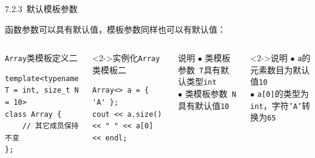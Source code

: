 \begin{frame}[fragile]{7.2.3~默认模板参数}

\alert{函数参数}可以具有默认值，\alert{模板参数}同样也可以有默认值：

\vspace{-4mm}

\begin{columns}[t]

\begin{blueblock}{\texttt{Array}类模板定义二}
\vspace{-1mm}\begin{lstlisting}[moreemph={Array,T,Less,F}]
template<typename T = int, size_t N = 10>
class Array {
    // 其它成员保持不变
};
\end{lstlisting}\vspace{-1mm}
\end{blueblock}
\begin{blueblock}<2->{实例化\texttt{Array}类模板二}
\begin{lstlisting}[moreemph={Array}]
Array<> a = { 'A' };
cout << a.size() << " " << a[0] << endl;
\end{lstlisting}
\end{blueblock}

\begin{yellowblock}{说明}
$\bullet$ \alert{类模板参数}~\texttt{T}具有默认类型\texttt{int}\\
$\bullet$ \alert{类模板参数}~\texttt{N}具有默认值\texttt{10}
\end{yellowblock}
\begin{yellowblock}<2->{说明}
$\bullet$ \texttt{a}的元素数目为默认值\texttt{10}\\
$\bullet$ \texttt{a[0]}的类型为\texttt{int}，字符\texttt{'A'}转换为\texttt{65}
\end{yellowblock}

\end{columns}

\end{frame}


